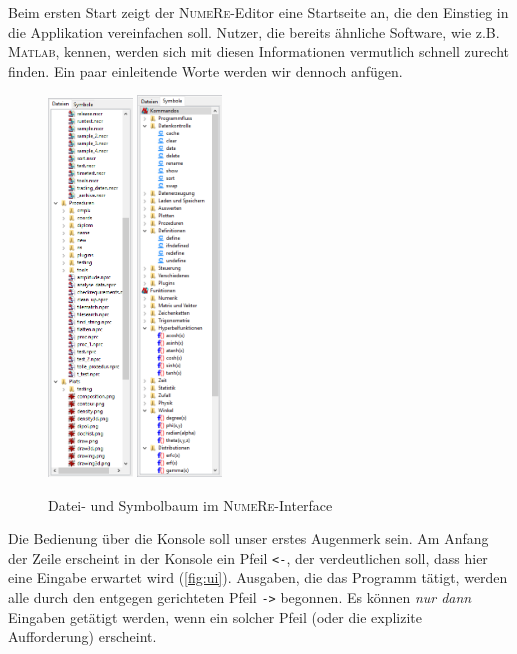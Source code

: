 \documentclass[DIV=14,headsepline,footsepline]{scrbook}
\newcommand{\NR}{\textsc{Nu\-me\-Re}}
\begin{document}
				Beim ersten Start zeigt der \NR-Editor eine Startseite an, die den Einstieg in die Applikation vereinfachen soll. Nutzer, die bereits ähnliche Software, wie z.B. \textsc{Matlab}, kennen, werden sich mit diesen Informationen vermutlich schnell zurecht finden. Ein paar einleitende Worte werden wir dennoch anfügen.
				\begin{figure}[p]%
					\centering
					\includegraphics[width=0.2\textwidth]{_graphics/filetree.png}\hspace{5em}
					\includegraphics[width=0.2\textwidth]{_graphics/symboltree.png}
					\caption{Datei- und Symbolbaum im \NR-Interface}
					\label{fig:trees}
				\end{figure}
				Die Bedienung über die Konsole soll unser erstes Augenmerk sein. Am Anfang der Zeile erscheint in der Konsole ein Pfeil \verb+<-+, der verdeutlichen soll, dass hier eine Eingabe erwartet wird (\autoref{fig:ui}). Ausgaben, die das Programm tätigt, werden alle durch den entgegen gerichteten Pfeil \verb+->+ begonnen. Es können \emph{nur dann} Eingaben getätigt werden, wenn ein solcher Pfeil (oder die explizite Aufforderung) erscheint.
				
\end{document}
